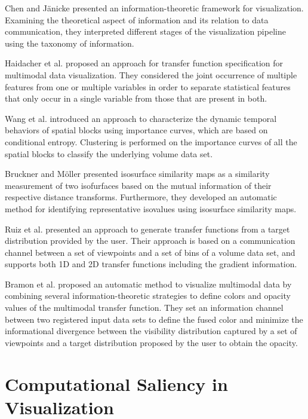 Chen and J{\"a}nicke \cite{chen_information-theoretic_2010} presented an information-theoretic framework for visualization. Examining the theoretical aspect of information and its relation to data communication, they interpreted different stages of the visualization pipeline using the taxonomy of information.

Haidacher et al. \cite{haidacher_information-based_2008} proposed an approach for transfer function specification for multimodal data visualization. They considered the joint occurrence of multiple features from one or multiple variables in order to separate statistical features that only occur in a single variable from those that are present in both.

Wang et al. \cite{wang_importance-driven_2008} introduced an approach to characterize the dynamic temporal behaviors of spatial blocks using importance curves, which are based on conditional entropy. Clustering is performed on the importance curves of all the spatial blocks to classify the underlying volume data set.

Bruckner and M{\"o}ller \cite{bruckner_isosurface_2010} presented isosurface similarity maps as a similarity measurement of two isofurfaces based on the mutual information of their respective distance transforms. Furthermore, they developed an automatic method for identifying representative isovalues using isosurface similarity maps.

Ruiz et al. \cite{ruiz_automatic_2011} presented an approach to generate transfer functions from a target distribution provided by the user. Their approach is based on a communication channel between a set of viewpoints and a set of bins of a volume data set, and supports both 1D and 2D transfer functions including the gradient information.

Bramon et al. \cite{bramon_information_2013} proposed an automatic method to visualize multimodal data by combining several information-theoretic strategies to define colors and opacity values of the multimodal transfer function.
They set an information channel between two registered input data sets to define the fused color and minimize the informational divergence between the visibility distribution captured by a set of viewpoints and a target distribution proposed by the user to obtain the opacity.

\section{Computational Saliency in Visualization}

